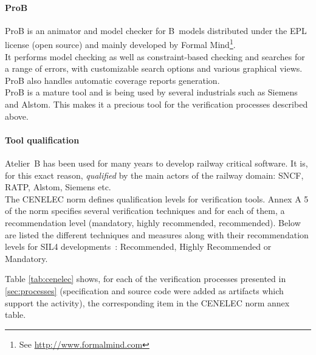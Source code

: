 \paragraph{ProB}
\label{subsec:prob}
ProB is an animator and model checker for B~models distributed under the EPL license (open source) and mainly developed by Formal Mind\footnote{See \url{http://www.formalmind.com}}.\\
It performs model checking as well as constraint-based checking and searches for a range of errors, with customizable search options and various graphical views. ProB also handles automatic coverage reports generation.\\
ProB is a mature tool and is being used by several industrials such as Siemens and Alstom. This makes it a precious tool for the verification processes described above.

\paragraph{Tool qualification}
\label{subsec:qualif}
Atelier~B has been used for many years to develop railway critical software. It is, for this exact reason, {\itshape qualified} by the main actors of the railway domain: SNCF, RATP, Alstom, Siemens etc.\\

The CENELEC norm defines qualification levels for verification tools. Annex A 5 of the norm specifies several verification techniques and for each of them, a recommendation level (mandatory, highly recommended, recommended). Below are listed the different techniques and measures along with their recommendation levels for SIL4 developments~: Recommended, Highly Recommended or Mandatory.

Table \ref{tab:cenelec} shows, for each of the verification processes presented in \ref{sec:processes} (specification and source code were added as artifacts which support the activity), the corresponding item in the CENELEC norm annex table.

